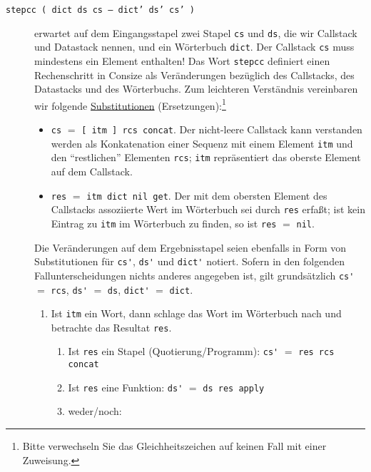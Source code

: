 \begin{description}\label{description.stepcc}
\item[\texttt{stepcc ( dict ds cs -- dict' ds' cs' )}] erwartet auf dem Eingangsstapel zwei Stapel \verb|cs| und \verb|ds|, die wir Callstack und Datastack nennen, und ein Wörterbuch \verb|dict|. Der Callstack \verb|cs| muss mindestens ein Element enthalten! Das Wort \verb|stepcc| definiert einen Rechenschritt in Consize als Ver\-än\-de\-rung\-en bezüglich des Callstacks, des Datastacks und des Wör\-ter\-buchs.
%
Zum leichteren Verständnis vereinbaren wir folgende \href{http://de.wikipedia.org/wiki/Substitution\_(Logik)}{Substitutionen} (Ersetzungen):\footnote{Bitte verwechseln Sie das Gleichheitszeichen auf keinen Fall mit einer Zuweisung.}
\begin{itemize}
\item \verb|cs| $=$ \verb|[ itm ] rcs concat|. Der nicht-leere Callstack kann verstanden werden als Konkatenation einer Sequenz mit einem Element \verb|itm| und den "`restlichen"' Elementen \verb|rcs|; \verb|itm| repräsentiert das oberste Element auf dem Callstack.
\item \verb|res| $=$ \verb|itm dict nil get|. Der mit dem obersten Element des Callstacks assoziierte Wert im Wörterbuch sei durch \verb|res| erfaßt; ist kein Eintrag zu \verb|itm| im Wörterbuch zu finden, so ist \verb|res| $=$ \verb|nil|.
\end{itemize}
Die Veränderungen auf dem Ergebnisstapel seien ebenfalls in Form von Substitutionen für \verb|cs'|, \verb|ds'| und \verb|dict'| notiert. Sofern in den folgenden Fallunterscheidungen nichts anderes angegeben ist, gilt grundsätzlich \verb|cs'| $=$ \verb|rcs|, \verb|ds'| $=$ \verb|ds|, \verb|dict'| $=$ \verb|dict|.
\begin{enumerate}
\item Ist \verb|itm| ein Wort,
  dann schlage das Wort im Wörterbuch nach und betrachte das 
  Resultat \verb|res|.
  \begin{enumerate}
  \item Ist \verb|res| ein Stapel (Quotierung\slash Programm):
    \newline\verb|cs'| $=$ \verb|res rcs concat|
  \item Ist \verb|res| eine Funktion:
    \newline\verb|ds'| $=$ \verb|ds res apply|
  \item weder\slash noch:

\end{enumerate}
\end{enumerate}
\end{description}
